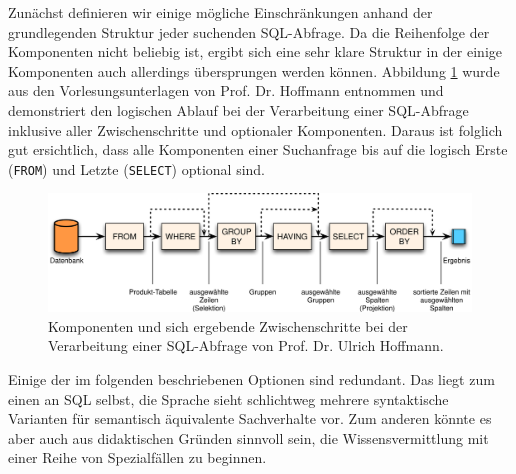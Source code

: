 Zunächst definieren wir einige mögliche Einschränkungen anhand der grundlegenden Struktur jeder suchenden SQL-Abfrage. Da die Reihenfolge der Komponenten nicht beliebig ist, ergibt sich eine sehr klare Struktur in der einige Komponenten auch allerdings übersprungen werden können. Abbildung \ref{fig:sql-steps} wurde aus den Vorlesungsunterlagen von Prof. Dr. Hoffmann entnommen und demonstriert den logischen Ablauf bei der Verarbeitung einer SQL-Abfrage inklusive aller Zwischenschritte und optionaler Komponenten. Daraus ist folglich gut ersichtlich, dass alle Komponenten einer Suchanfrage bis auf die logisch Erste (\texttt{FROM}) und Letzte (\texttt{SELECT}) optional sind.

\begin{figure}
  \centering \includegraphics{images/sql-steps.png}
  \caption{Komponenten und sich ergebende Zwischenschritte bei der Verarbeitung einer SQL-Abfrage von Prof. Dr. Ulrich Hoffmann.}
  \label{fig:sql-steps}
\end{figure}

Einige der im folgenden beschriebenen Optionen sind redundant. Das liegt zum einen an SQL selbst, die Sprache sieht schlichtweg mehrere syntaktische Varianten für semantisch äquivalente Sachverhalte vor. Zum anderen könnte es aber auch aus didaktischen Gründen sinnvoll sein, die Wissensvermittlung mit einer Reihe von Spezialfällen zu beginnen.


